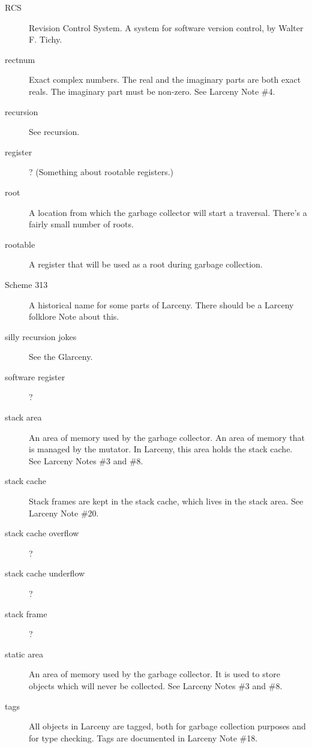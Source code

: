 \begin{description}
\item[RCS]
Revision Control System.  A system for software version control, by 
Walter F. Tichy.

\item[rectnum]
Exact complex numbers.  The real and the imaginary parts are both exact
reals. The imaginary part must be non-zero.
See Larceny Note \#4.

\item[recursion]  
See recursion.

\item[register]
?  (Something about rootable registers.)

\item[root]
A location from which the garbage collector will start a traversal.
There's a fairly small number of roots.

\item[rootable]
A register that will be used as a root during garbage collection.

\item[Scheme 313]
A historical name for some parts of Larceny.  There should be
a Larceny folklore Note about this.

\item[silly recursion jokes]
See the Glarceny.

\item[software register]
?

\item[stack area]
An area of memory used by the garbage collector.  An area of memory
that is managed by the mutator. In Larceny, this area holds the stack 
cache.
See Larceny Notes \#3 and \#8.

\item[stack cache]
Stack frames are kept in the stack cache, which lives in the stack area.
See Larceny Note \#20.

\item[stack cache overflow]
?

\item[stack cache underflow]
?

\item[stack frame]
?

\item[static area]
An area of memory used by the garbage collector.  It is used to store
objects which will never be collected.
See Larceny Notes \#3 and \#8.

\item[tags]
All objects in Larceny are tagged, both for garbage collection purposes
and for type checking.  Tags are documented in Larceny Note \#18.


\end{description}

